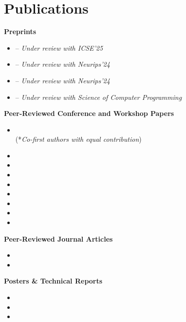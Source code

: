 \documentclass[letterpaper,11pt]{article}
\begin{document}
\section{Publications}

\textbf{Preprints}\vspace{-4pt}
\begin{itemize}
  \item {} -- \emph{Under review with ICSE'25}
  \item {} -- \emph{Under review with Neurips'24}
  \item {} -- \emph{Under review with Neurips'24}
  \item {} -- \emph{Under review with Science of Computer Programming}
\end{itemize}


\textbf{Peer-Reviewed Conference and Workshop Papers}\vspace{-4pt}

\begin{itemize}
  \item {} \\ (*\emph{Co-first authors with equal contribution})
  \item {}
  \item {}
  \item {}
  \item {}
  \item {}
  \item {}
  \item {}
  \item {}
\end{itemize}

\textbf{Peer-Reviewed Journal Articles}\vspace{-4pt}

\begin{itemize}
  \item {}
  \item {}
\end{itemize}

\textbf{Posters \& Technical Reports}\vspace{-4pt}
\begin{itemize}
  \item {}
  \item {}
  \item {}
\end{itemize}
\end{document}
